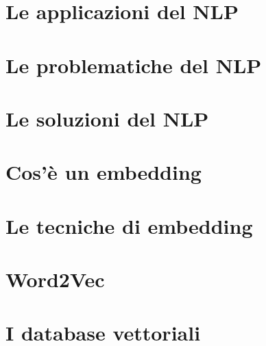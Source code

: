 \section{Le applicazioni del NLP}

\section{Le problematiche del NLP}

\section{Le soluzioni del NLP}

\section{Cos'è un embedding}

\section{Le tecniche di embedding}

\section{Word2Vec}

\section{I database vettoriali}
